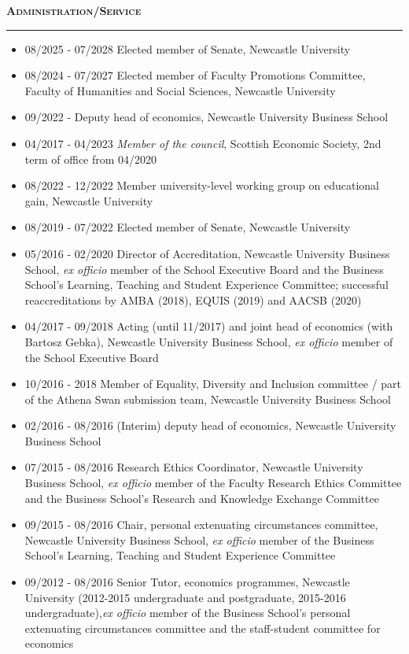 \documentclass[10pt,pdftex,a4paper,oneside]{article}
\begin{document}
\textbf{\textsc{Administration/Service}}
\vspace{.5ex}
\hrule
\begin{itemize}[noitemsep,nolistsep]
\item[] 08/2025 - 07/2028 Elected member of Senate, Newcastle University
\item[] 08/2024 - 07/2027 Elected member of Faculty Promotions Committee, Faculty of Humanities and Social Sciences, Newcastle University
\item[] 09/2022 - Deputy head of economics, Newcastle University Business School
\item[] 04/2017 - 04/2023 \emph{Member of the council}, Scottish Economic Society, 2nd term of office from 04/2020
\item[] 08/2022 - 12/2022 Member university-level working group on educational gain, Newcastle University
\item[] 08/2019 - 07/2022 Elected member of Senate, Newcastle University
\item[] 05/2016 - 02/2020 Director of Accreditation, Newcastle University Business School, \emph{ex officio} member of the School Executive Board and the Business School's Learning, Teaching and Student Experience Committee; successful reaccreditations by AMBA (2018), EQUIS (2019) and AACSB (2020)
\item[] 04/2017 - 09/2018 Acting (until 11/2017) and joint head of economics (with Bartosz Gebka), Newcastle University Business School, \emph{ex officio} member of the School Executive Board
\item[] 10/2016 - 2018 Member of Equality, Diversity and Inclusion committee / part of the Athena Swan submission team, Newcastle University Business School
\item[] 02/2016 - 08/2016 (Interim) deputy head of economics, Newcastle University Business School
\item[] 07/2015 - 08/2016 Research Ethics Coordinator, Newcastle University Business School, \emph{ex officio} member of the Faculty Research Ethics Committee and the Business School's Research and Knowledge Exchange Committee
\item[] 09/2015 - 08/2016 Chair, personal extenuating circumstances committee, Newcastle University Business School, \emph{ex officio} member of the Business School's Learning, Teaching and Student Experience Committee
\item[] 09/2012 - 08/2016 Senior Tutor, economics programmes, Newcastle University (2012-2015 undergraduate and postgraduate, 2015-2016 undergraduate),\emph{ex officio} member of the Business School's personal extenuating circumstances committee and the staff-student committee for economics

\end{itemize}
\end{document}
